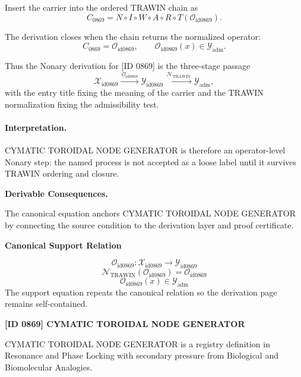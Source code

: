 Insert the carrier into the ordered TRAWIN chain as\[
C_{0869}=N\circ I\circ W\circ A\circ R\circ T(\mathcal{O}_{\mathrm{id0869}}).
\]

The derivation closes when the chain returns the normalized operator:\[
C_{0869}=\mathcal{O}_{\mathrm{id0869}},\qquad \mathcal{O}_{\mathrm{id0869}}(x)\in\mathcal{Y}_{\mathrm{adm}}.
\]

Thus the Nonary derivation for [ID 0869] is the three-stage passage
\[
\mathcal{X}_{\mathrm{id0869}}\xrightarrow{\,\mathcal{O}_{\mathrm{id0869}}\,} \mathcal{Y}_{\mathrm{id0869}}\xrightarrow{\,\mathcal{N}_{\mathrm{TRAWIN}}\,} \mathcal{Y}_{\mathrm{adm}},
\]
with the entry title fixing the meaning of the carrier and the TRAWIN normalization fixing the admissibility test.

\paragraph{Interpretation.} CYMATIC TOROIDAL NODE GENERATOR is therefore an operator-level Nonary step: the named process is not accepted as a loose label until it survives TRAWIN ordering and closure.

\par\vspace{0.35em}
\noindent\textbf{Derivable Consequences.}\quad
\begingroup
\footnotesize
\raggedright
The canonical equation anchors CYMATIC TOROIDAL NODE GENERATOR by connecting the source condition to the derivation layer and proof certificate.
\par\endgroup

\noindent\textbf{Canonical Support Relation}\par
\[
\mathcal{O}_{\mathrm{id0869}}:\mathcal{X}_{\mathrm{id0869}}\longrightarrow\mathcal{Y}_{\mathrm{id0869}}
\]
\[
\mathcal{N}_{\mathrm{TRAWIN}}(\mathcal{O}_{\mathrm{id0869}})=\mathcal{O}_{\mathrm{id0869}}
\]
\[
\mathcal{O}_{\mathrm{id0869}}(x)\in\mathcal{Y}_{\mathrm{adm}}
\]
\noindent The support equation repeats the canonical relation so the derivation page remains self-contained.\par

\clearpage
\noindent\textbf{[ID 0869] CYMATIC TOROIDAL NODE GENERATOR}\par
\vspace{0.35em}
\begingroup\small
{}
CYMATIC TOROIDAL NODE GENERATOR is a registry definition in Resonance and Phase Locking with secondary pressure from Biological and Biomolecular Analogies.

